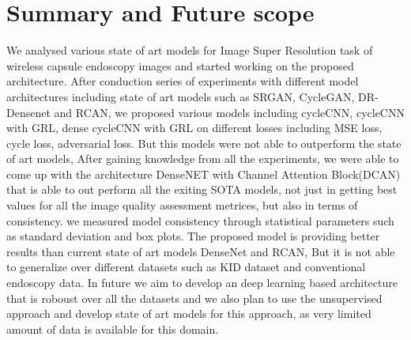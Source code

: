 
\chapter*{Summary and Future scope}
We analysed various state of art models for Image Super Resolution task of wireless capsule endoscopy images and started working on the proposed architecture. After conduction series of experiments with different model architectures including state of art models such as SRGAN, CycleGAN, DR-Densenet and RCAN, we proposed various models including cycleCNN, cycleCNN with GRL, dense cycleCNN with GRL on different losses including MSE loss, cycle loss, adversarial loss. But this models were not able to outperform the state of art models, After gaining knowledge from all the experiments, we were able to come up with the architecture DenseNET with Channel Attention Block(DCAN) that is able to out perform all the exiting SOTA models, not just in getting best values for all the image quality assessment metrices, but also in terms of consistency. we measured model consistency through statistical parameters such as standard deviation and box plots.
The proposed model is providing better results than current state of art models DenseNet and RCAN, But it is not able to generalize over different datasets such as KID dataset and conventional endoscopy data. In future we aim to develop an deep learning based architecture that is roboust over all the datasets and we also plan to use the unsupervised approach and develop state of art models for this approach, as very limited amount of data is available for this domain.
